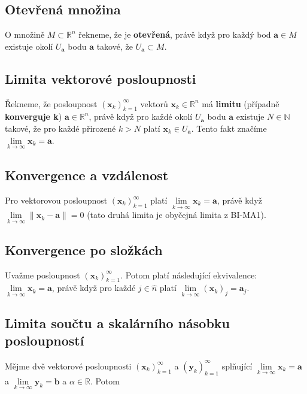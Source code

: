 \subsection*{Otevřená množina}

O množině $M \subset \mathbb{R}^n$ řekneme, že je \textbf{otevřená}, právě když
pro každý bod $\mathbf{a} \in M$ existuje okolí $U_{\mathbf{a}}$ bodu
$\mathbf{a}$ takové, že $U_{\mathbf{a}} \subset M$.

\subsection*{Limita vektorové posloupnosti}

Řekneme, že posloupnost $(\mathbf{x}_k)_{k=1}^\infty$ vektorů $\mathbf{x}_k \in \mathbb{R}^n$ má \textbf{limitu} (případně \textbf{konverguje k}) $\mathbf{a} \in \mathbb{R}^n$, právě když pro každé okolí $U_\mathbf{a}$ bodu $\mathbf{a}$ existuje $N \in \mathbb{N}$ takové, že pro každé přirozené $k > N$ platí $\mathbf{x}_k \in U_\mathbf{a}$.
Tento fakt značíme $\lim\limits_{k\to\infty} \mathbf{x}_k = \mathbf{a}$.

\subsection*{Konvergence a vzdálenost}

Pro vektorovou posloupnost $(\mathbf{x}_k)_{k=1}^\infty$ platí
$\lim\limits_{k\to \infty} \mathbf{x}_k = \mathbf{a}$, právě když
$\lim\limits_{k \to \infty} \| \mathbf{x}_k - \mathbf{a} \| = 0$ (tato druhá
limita je obyčejná limita z BI-MA1).

\subsection*{Konvergence po složkách}

Uvažme posloupnost $(\mathbf{x}_k)_{k=1}^\infty$. Potom platí následující
ekvivalence: $\lim\limits_{k\to\infty} \mathbf{x}_k = \mathbf{a}$, právě když
pro každé $j\in\hat n$ platí $\lim\limits_{k \to \infty} (\mathbf{x}_k)_j =
    \mathbf{a}_j$.

\subsection*{Limita součtu a skalárního násobku posloupností}

Mějme dvě vektorové posloupnosti $(\mathbf{x}_k)_{k=1}^\infty$ a
$(\mathbf{y}_k)_{k=1}^\infty$ splňující $\lim\limits_{k\to\infty} \mathbf{x}_k
    = \mathbf{a}$ a $\lim\limits_{k\to\infty} \mathbf{y}_k = \mathbf{b}$ a $\alpha
    \in \mathbb{R}$. Potom

